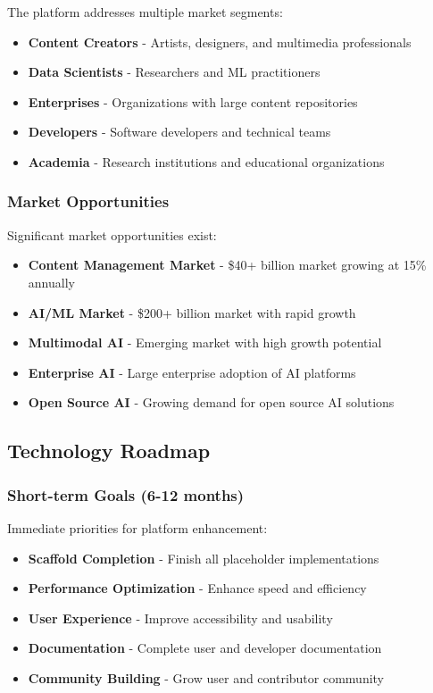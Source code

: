 \documentclass[11pt]{article}
\begin{document}
The platform addresses multiple market segments:

\begin{itemize}
\item \textbf{Content Creators} - Artists, designers, and multimedia professionals
\item \textbf{Data Scientists} - Researchers and ML practitioners
\item \textbf{Enterprises} - Organizations with large content repositories
\item \textbf{Developers} - Software developers and technical teams
\item \textbf{Academia} - Research institutions and educational organizations
\end{itemize}

\subsubsection{Market Opportunities}

Significant market opportunities exist:

\begin{itemize}
\item \textbf{Content Management Market} - \$40+ billion market growing at 15\% annually
\item \textbf{AI/ML Market} - \$200+ billion market with rapid growth
\item \textbf{Multimodal AI} - Emerging market with high growth potential
\item \textbf{Enterprise AI} - Large enterprise adoption of AI platforms
\item \textbf{Open Source AI} - Growing demand for open source AI solutions
\end{itemize}

\subsection{Technology Roadmap}

\subsubsection{Short-term Goals (6-12 months)}

Immediate priorities for platform enhancement:

\begin{itemize}
\item \textbf{Scaffold Completion} - Finish all placeholder implementations
\item \textbf{Performance Optimization} - Enhance speed and efficiency
\item \textbf{User Experience} - Improve accessibility and usability
\item \textbf{Documentation} - Complete user and developer documentation
\item \textbf{Community Building} - Grow user and contributor community
\end{itemize}
\end{document}
